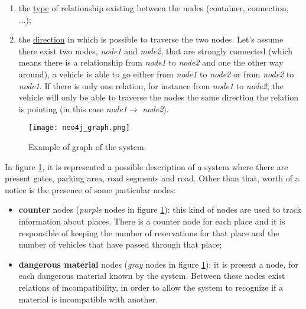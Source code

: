 \begin{enumerate}
  \item the \underline{type} of relationship existing between the nodes (container, connection, ...);
  \item the \underline{direction} in which is possible to traverse the two nodes. Let's assume there exist two nodes, \textit{node1} and \textit{node2}, that are strongly connected (which means there is a relationship from \textit{node1} to \textit{node2} and one the other way around), a vehicle is able to go either from \textit{node1} to \textit{node2} or from \textit{node2} to \textit{node1}. If there is only one relation, for instance from \textit{node1} to \textit{node2}, the vehicle will only be able to traverse the nodes the same direction the relation is pointing (in this case \textit{node1}$\rightarrow$ \textit{node2}).
\end{enumerate}
\begin{figure}[!htb]
   \centering
   \texttt{[image: neo4j\_graph.png]}
   \caption{Example of graph of the system.}\label{Fig:Neo4jGraph}
\end{figure}
In figure \ref{Fig:Neo4jGraph}, it is represented a possible description of a system where there are present gates, parking area, road segments and road. Other than that, worth of a notice is the presence of some particular nodes:
\begin{itemize}
  \item \textbf{counter} nodes (\textit{purple} nodes in figure \ref{Fig:Neo4jGraph}): this kind of nodes are used to track information about places. There is a counter node for each place and it is responsible of keeping the number of reservations for that place and the number of vehicles that have passed through that place;
  \item \textbf{dangerous material} nodes (\textit{gray} nodes in figure \ref{Fig:Neo4jGraph}): it is present a node, for each dangerous material known by the system. Between these nodes exist relations of incompatibility, in order to allow the system to recognize if a material is incompatible with another.
\end{itemize}
